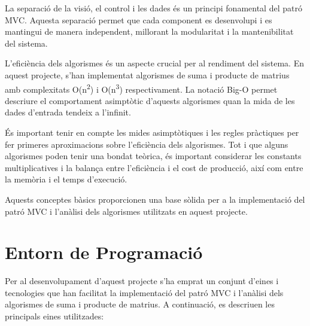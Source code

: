 \documentclass{ieeetj}
\begin{document}
La separació de la visió, el control i les dades és un principi fonamental del patró MVC. Aquesta separació permet que cada component es desenvolupi i es mantingui de manera independent, millorant la modularitat i la mantenibilitat del sistema.

L'eficiència dels algorismes és un aspecte crucial per al rendiment del sistema. En aquest projecte, s'han implementat algorismes de suma i producte de matrius amb complexitats O(n\textsuperscript{2}) i O(n\textsuperscript{3}) respectivament. La notació Big-O permet descriure el comportament asimptòtic d'aquests algorismes quan la mida de les dades d'entrada tendeix a l'infinit.

És important tenir en compte les mides asimptòtiques i les regles pràctiques per fer primeres aproximacions sobre l'eficiència dels algorismes. Tot i que alguns algorismes poden tenir una bondat teòrica, és important considerar les constants multiplicatives i la balança entre l'eficiència i el cost de producció, així com entre la memòria i el temps d'execució.

Aquests conceptes bàsics proporcionen una base sòlida per a la implementació del patró MVC i l'anàlisi dels algorismes utilitzats en aquest projecte.

\section{Entorn de Programació}
Per al desenvolupament d'aquest projecte s'ha emprat un conjunt d'eines i tecnologies que han facilitat la implementació del patró MVC i l'anàlisi dels algorismes de suma i producte de matrius. A continuació, es descriuen les principals eines utilitzades:
\end{document}
